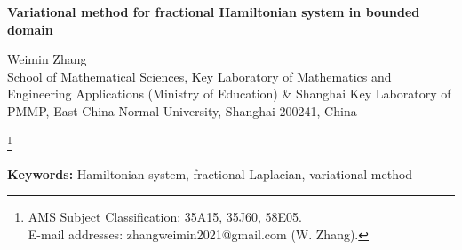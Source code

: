 \documentclass[10pt]{article}
\numberwithin{equation}{section}
\renewcommand\theequation{\thesection.\arabic{equation}}
\numberwithin{equation}{section}
\begin{document}
\begin{center}
\textbf{Variational method for fractional Hamiltonian system in bounded domain}\\
\end{center}

\begin{center}
Weimin Zhang\\
School of Mathematical Sciences,  Key Laboratory of Mathematics and Engineering Applications (Ministry of Education) \& Shanghai Key Laboratory of PMMP,  East China Normal University, Shanghai 200241, China
\end{center}
\begin{center}
\renewcommand{\theequation}{\arabic{section}.\arabic{equation}}
\footnote[0]{\hspace*{-7.4mm}
AMS Subject Classification: 35A15, 35J60, 58E05.\\
{E-mail addresses: zhangweimin2021@gmail.com (W. Zhang).}}
\end{center}

\begin{abstract}
Here we consider the following fractional Hamiltonian system
\begin{equation*}
\begin{cases}
\begin{aligned}
(-\Delta)^{s} u&=H_v(u,v) \;\;&&\text{in}~\Omega,\\
(-\Delta)^{s} v&=H_u(u,v) &&\text{in}~\Omega,\\
u &= v = 0 &&\text{in} ~ \mathbb{R}^N\setminus\Omega,
\end{aligned}
\end{cases}
\end{equation*}
where $s\in (0,1)$, $N>2s$, $H \in C^1(\mathbb{R}^2, \mathbb{R})$ and $\Omega \subset \mathbb{R}^N$ is a smooth bounded domain. 

To apply the variational method for this problem, the key question is to find a suitable functional setting. Instead of usual fractional Sobolev spaces, we use the solutions space of $(-\Delta)^{s}u=f\in L^r(\Omega)$ for $r\ge 1$, for which we show the (compact) embedding properties. When $H$ has subcritical and superlinear growth, we construct two frameworks, respectively with interpolation space method and dual method, to show the existence of nontrivial solution. 
As byproduct, we revisit the fractional Lane-Emden system, i.e. $H(u, v)=\frac{1}{p+1}|u|^{p+1}+\frac{1}{q+1}|v|^{q+1}$, and consider the existence, uniqueness of (radial) positive solutions under subcritical assumption.
\end{abstract}
\textbf{Keywords:} Hamiltonian system, fractional Laplacian, variational method
\end{document}
